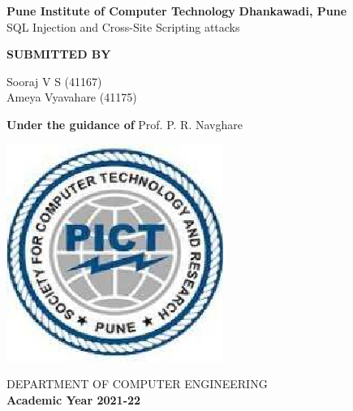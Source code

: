 \documentclass[a4paper, 12pt, fleqn]{article}
\begin{document}
 
\begin{titlepage}
    \begin{center}
        \vspace*{1cm}
        \par
        \large
                \textbf{Pune Institute of Computer Technology}	
                \linebreak
		\textbf{Dhankawadi, Pune}
        \vspace{0.5cm}
        \linebreak
        \vspace{0.5cm}
        \large
        \\SQL Injection and Cross-Site Scripting attacks  
        \linebreak
        \linebreak
		
		\textbf{SUBMITTED BY}
		\vspace{1cm}
		
         Sooraj V S (41167) \\
         Ameya Vyavahare (41175)
        \linebreak
        \linebreak
		        
        \textbf{\large{Under the guidance of}}
		\linebreak
	    Prof. P. R. Navghare
		\linebreak
        
        
        
        \vspace{0.8cm}
        

        \includegraphics[scale=0.6]{pict}   
        
        \Large
        DEPARTMENT OF COMPUTER ENGINEERING\\
		\textbf{Academic Year 2021-22}
        
    \end{center}
\end{titlepage}
\pagebreak
\end{document}
